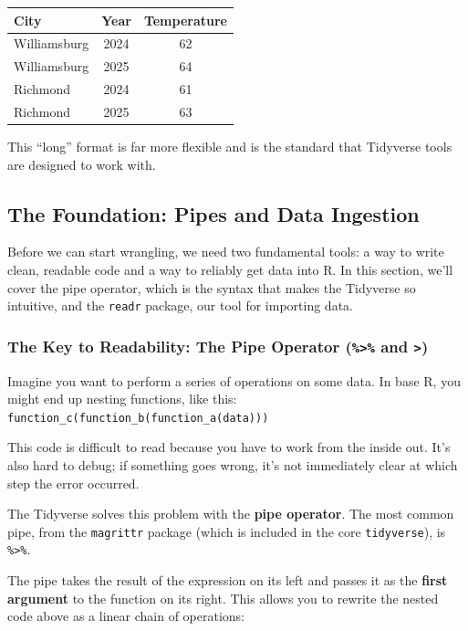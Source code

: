 \documentclass[
  11pt,
]{article}
\begin{document}
\begin{longtable}[]{@{}lcc@{}}
\toprule\noalign{}
City & Year & Temperature \\
\midrule\noalign{}
\endhead
\bottomrule\noalign{}
\endlastfoot
Williamsburg & 2024 & 62 \\
Williamsburg & 2025 & 64 \\
Richmond & 2024 & 61 \\
Richmond & 2025 & 63 \\
\end{longtable}

This ``long'' format is far more flexible and is the standard that
Tidyverse tools are designed to work with.

\subsection{The Foundation: Pipes and Data
Ingestion}\label{the-foundation-pipes-and-data-ingestion}

Before we can start wrangling, we need two fundamental tools: a way to
write clean, readable code and a way to reliably get data into R. In
this section, we'll cover the pipe operator, which is the syntax that
makes the Tidyverse so intuitive, and the \texttt{readr} package, our
tool for importing data.

\subsubsection{\texorpdfstring{The Key to Readability: The Pipe Operator
(\texttt{\%\textgreater{}\%} and
\texttt{\textbar{}\textgreater{}})}{The Key to Readability: The Pipe Operator (\%\textgreater\% and \textbar\textgreater)}}\label{the-key-to-readability-the-pipe-operator-and}

Imagine you want to perform a series of operations on some data. In base
R, you might end up nesting functions, like this:
\texttt{function\_c(function\_b(function\_a(data)))}

This code is difficult to read because you have to work from the inside
out. It's also hard to debug; if something goes wrong, it's not
immediately clear at which step the error occurred.

The Tidyverse solves this problem with the \textbf{pipe operator}. The
most common pipe, from the \texttt{magrittr} package (which is included
in the core \texttt{tidyverse}), is \texttt{\%\textgreater{}\%}.

The pipe takes the result of the expression on its left and passes it as
the \textbf{first argument} to the function on its right. This allows
you to rewrite the nested code above as a linear chain of operations:
\end{document}
